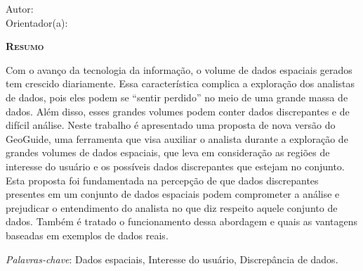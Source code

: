 \begin{center}
	{\Large{\textbf{\thesistitle}}}
\end{center}

\vspace{1cm}

\begin{flushright}
	Autor: \thesisauthor\\
	Orientador(a): \thesissupervisor
\end{flushright}

\vspace{1cm}

\begin{center}
	\Large{\textsc{\textbf{Resumo}}}
\end{center}

\noindent Com o avanço da tecnologia da informação, o volume de dados espaciais gerados tem crescido diariamente. Essa característica complica a exploração dos analistas de dados, pois eles podem se ``sentir perdido'' no meio de uma grande massa de dados. Além disso, esses grandes volumes podem conter dados discrepantes e de difícil análise. Neste trabalho é apresentado uma proposta de nova versão do GeoGuide, uma ferramenta que visa auxiliar o analista durante a exploração de grandes volumes de dados espaciais, que leva em consideração as regiões de interesse do usuário e os possíveis dados discrepantes que estejam no conjunto. Esta proposta foi fundamentada na percepção de que dados discrepantes presentes em um conjunto de dados espaciais podem comprometer a análise e prejudicar o entendimento do analista no que diz respeito aquele conjunto de dados. Também é tratado o funcionamento dessa abordagem e quais as vantagens baseadas em exemplos de dados reais.

\noindent\textit{Palavras-chave}: Dados espaciais, Interesse do usuário, Discrepância de dados.